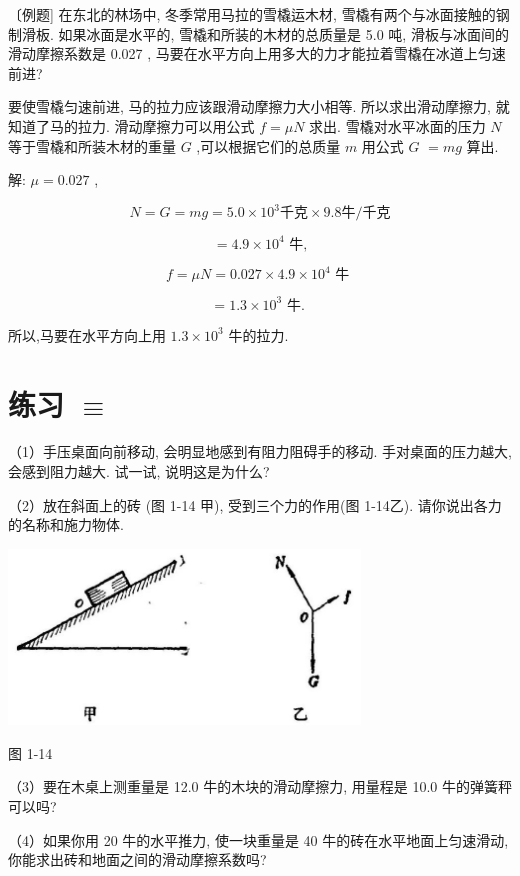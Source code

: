 \documentclass[10pt]{article}
\begin{document}
〔例题] 在东北的林场中, 冬季常用马拉的雪橇运木材, 雪橇有两个与冰面接触的钢制滑板. 如果冰面是水平的, 雪橇和所装的木材的总质量是 5.0 吨, 滑板与冰面间的滑动摩擦系数是 0.027 , 马要在水平方向上用多大的力才能拉着雪橇在冰道上匀速前进?

要使雪橇匀速前进, 马的拉力应该跟滑动摩擦力大小相等. 所以求出滑动摩擦力, 就知道了马的拉力. 滑动摩擦力可以用公式 \(f = {\mu N}\) 求出. 雪橇对水平冰面的压力 \(N\) 等于雪橇和所装木材的重量 \(G\) ,可以根据它们的总质量 \(m\) 用公式 \(G\) \(= {mg}\) 算出.

解: \(\mu = {0.027}\) ,

\[
N = G = {mg} = {5.0} \times {10}^{3}\text{千克} \times {9.8}\text{牛/千克}
\]

\[
= {4.9} \times {10}^{4}\text{ 牛,}
\]

\[
f = {\mu N} = {0.027} \times {4.9} \times {10}^{4}\text{ 牛 }
\]

\[
= {1.3} \times {10}^{3}\text{ 牛. }
\]

所以,马要在水平方向上用 \({1.3} \times {10}^{3}\) 牛的拉力.

\section*{练习 \(\equiv\)}

（1）手压桌面向前移动, 会明显地感到有阻力阻碍手的移动. 手对桌面的压力越大, 会感到阻力越大. 试一试, 说明这是为什么?

（2）放在斜面上的砖 (图 1-14 甲), 受到三个力的作用(图 1-14乙). 请你说出各力的名称和施力物体.

\begin{center}
\includegraphics[max width=0.7\textwidth]{images/01912d55-147c-70aa-b0e0-1782a122f948_28_563798.jpg}
\end{center}

图 1-14

（3）要在木桌上测重量是 12.0 牛的木块的滑动摩擦力, 用量程是 10.0 牛的弹簧秤可以吗?

（4）如果你用 20 牛的水平推力, 使一块重量是 40 牛的砖在水平地面上匀速滑动, 你能求出砖和地面之间的滑动摩擦系数吗?
\end{document}

